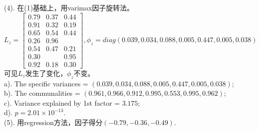 \documentclass[UTF8,12pt]{article}
\newenvironment{answer}
{%
}
{}
\begin{document}
\begin{answer}
	(4). 在(1)基础上，用varimax因子旋转法。
	$$
	L_z = \begin{bmatrix}
		0.79 & 0.37 & 0.44\\
		0.91 & 0.32 & 0.19\\
		0.65 & 0.54 & 0.44\\
		0.26 & 0.96 & \\
		0.54 & 0.47 & 0.21\\
		0.30 &  & 0.95\\
		0.92 & 0.18 & 0.30
	\end{bmatrix},
	\phi_z = diag(0.039, 0.034, 0.088, 0.005, 0.447, 0.005, 0.038)
	$$
	可见$L_z$发生了变化，$\phi_z$不变。\\
	a). The specific variances = $(0.039, 0.034, 0.088, 0.005, 0.447, 0.005, 0.038)$;\\
	b). The communalities = $(0.961,0.966,0.912,0.995,0.553,0.995,0.962)$;\\
	c). Variance explained by 1st factor = $3.175$;\\
	d). $p=2.01\times 10^{-13}$.\\
	(5). 用regression方法，因子得分$(-0.79,-0.36,-0.49)$.
\end{answer}
\end{document}
